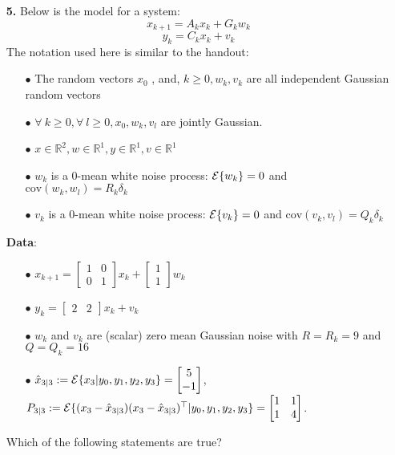 \documentclass[letterpaper]{article}
\newcommand{\real}{\mathbb R}  %
\newcommand{\cov}{\mathrm{cov}}
\newcommand{\Expectof}[1]{{\cal E} \{ #1 \}}
\newcommand{\ExpectofGiven}[2]{{\cal E} \{ #1 | #2 \}}
\begin{document}
\begin{enumerate}
\item[{\bf 5.}] Below is the model for a system: \\
$$x_{k+1} = A_k x_k  + G_k w_k$$
$$y_k = C_k x_k + v_k $$
The notation used here is similar to the handout:
	\begin{enumerate}
	\item[$\bullet$] The random vectors $x_0$ , and, $k \geq 0 , w_k , v_k$ are all independent Gaussian random vectors
	\item[$\bullet$] $\forall ~k \geq 0, \forall~ l \geq 0 , x_0 , w_k , v_l$ are jointly Gaussian.
	\item[$\bullet$] $x \in \real^2 , w \in \real^1 , y \in \real^1 , v \in \real^1$
	\item[$\bullet$]$w_k $ is a 0-mean white noise process: $\Expectof{w_k}=0$ and $\cov (w_k,w_l) = R_k\delta_k$
	\item[$\bullet$]$v_k $ is a 0-mean white noise process: $\Expectof{v_k}=0$ and $\cov (v_k,v_l) = Q_k\delta_k$
	\end{enumerate}
	\textbf{Data}:
	\begin{enumerate}
		\item[$\bullet$] $x_{k+1} = \begin{bmatrix} 1 & 0 \\ 0 & 1\end{bmatrix} x_k
		+ \begin{bmatrix} 1 \\ 1 \end{bmatrix}w_k $
		\item[$\bullet$] $y_k = \begin{bmatrix} 2 & 2\end{bmatrix} x_k + v_k$
		\item[$\bullet$] $w_k$ and $v_k$ are (scalar) zero mean Gaussian noise with  $R = R_k= 9$ and $Q = Q_k= 16$
		\item[$\bullet$] $\hat{x}_{3|3} := \ExpectofGiven{x_3}{y_0,y_1,y_2,y_3} = \begin{bmatrix} 5 \\ -1\end{bmatrix} $, $P_{3|3} := \ExpectofGiven{(x_3 - \hat{x}_{3|3})(x_3 - \hat{x}_{3|3})^\top	}{y_0,y_1,y_2,y_3} = \begin{bmatrix} 1 & 1 \\ 1 & 4\end{bmatrix}$.
	\end{enumerate}
Which of the following statements are true?
	\begin{enumerate}
	    \setlength{\itemsep}{.15in}

\end{enumerate}
\end{enumerate}
\end{document}

